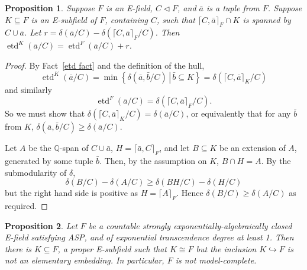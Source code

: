 \documentclass[12pt]{amsart}
\newtheorem{prop}{Proposition}[section]
\theoremstyle{definition}
\begin{document}
\begin{prop}\label{almost strong}
  Suppose $F$ is an E-field, $C {\ensuremath{\lhd}} F$, and ${{\ensuremath{\bar{a}}}}$ is a tuple from $F$. Suppose $K {\subseteq} F$ is an E-subfield of $F$, containing $C$, such that ${\ensuremath{\lceil {C,{{\ensuremath{\bar{a}}}}}\rceil}}_F \cap K$ is spanned by $C \cup {{\ensuremath{\bar{a}}}}$. Let $r = \delta({{\ensuremath{\bar{a}}}}/C) - \delta({\ensuremath{\lceil {C,{{\ensuremath{\bar{a}}}}}\rceil}}_F/C)$. Then $\operatorname{etd}^K({{\ensuremath{\bar{a}}}}/C) = \operatorname{etd}^F({{\ensuremath{\bar{a}}}}/C) + r$.
\end{prop}
\begin{proof}
  By Fact~\ref{etd fact} and the definition of the hull,
\[\operatorname{etd}^K({{\ensuremath{\bar{a}}}}/C) = \min{\ensuremath{\left\{ {\delta({{\ensuremath{\bar{a}}}},{{\ensuremath{\bar{b}}}}/C)} \,\left|\, {{{\ensuremath{\bar{b}}}} {\subseteq} K} \right.\right\}}} = \delta({\ensuremath{\lceil {C,{{\ensuremath{\bar{a}}}}}\rceil}}_K/C)\]
and similarly
\[\operatorname{etd}^F({{\ensuremath{\bar{a}}}}/C) = \delta({\ensuremath{\lceil {C,{{\ensuremath{\bar{a}}}}}\rceil}}_F/C).\]
So we must show that $\delta({\ensuremath{\lceil {C,{{\ensuremath{\bar{a}}}}}\rceil}}_K/C) = \delta({{\ensuremath{\bar{a}}}}/C)$, or equivalently that for any ${{\ensuremath{\bar{b}}}}$ from $K$, $\delta({{\ensuremath{\bar{a}}}},{{\ensuremath{\bar{b}}}}/C) {\ensuremath{\geqslant}} \delta({{\ensuremath{\bar{a}}}}/C)$.

  Let $A$ be the ${\ensuremath{\mathbb{Q}}}$-span of $C \cup {{\ensuremath{\bar{a}}}}$, $H = {\ensuremath{\lceil {{{\ensuremath{\bar{a}}}},C}\rceil}}_F$, and let $B {\subseteq} K$ be an extension of $A$, generated by some tuple ${{\ensuremath{\bar{b}}}}$. Then, by the assumption on $K$, $B \cap H = A$. By the submodularity of $\delta$, 
\[\delta(B/C) - \delta(A/C) {\ensuremath{\geqslant}} \delta(BH/C) - \delta(H/C)\]
but the right hand side is positive as $H = {\ensuremath{\lceil {A}\rceil}}_F$. Hence $\delta(B/C) {\ensuremath{\geqslant}} \delta(A/C)$ as required.
\end{proof}

\begin{prop}\label{non-model-complete}
Let $F$ be a countable strongly exponentially-algebraically closed E-field
satisfying ASP, and of exponential transcendence degree at least 1. Then there
is $K {\subseteq} F$, a proper E-subfield such that $K {\cong} F$ but the
inclusion $K {\hookrightarrow} F$ is not an elementary embedding. In particular,
$F$ is not model-complete.
\end{prop}
\end{document}
